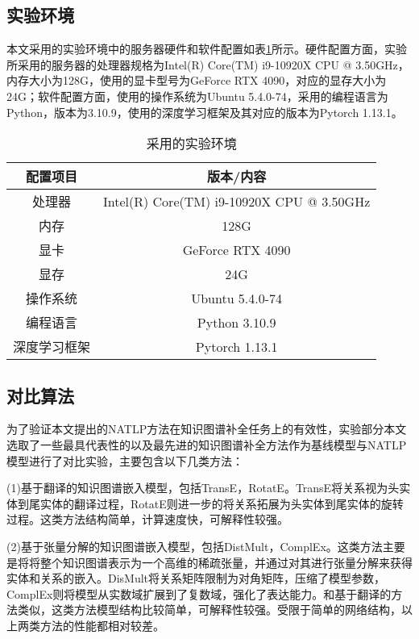 \subsection{实验环境}

本文采用的实验环境中的服务器硬件和软件配置如表\ref{environment}所示。硬件配置方面，实验所采用的服务器的处理器规格为Intel(R) Core(TM) i9-10920X CPU @ 3.50GHz，内存大小为128G，使用的显卡型号为GeForce RTX 4090，对应的显存大小为24G；软件配置方面，使用的操作系统为Ubuntu 5.4.0-74，采用的编程语言为Python，版本为3.10.9，使用的深度学习框架及其对应的版本为Pytorch 1.13.1。

\begin{table}[htbp]
    \renewcommand\arraystretch{1.5}
    \caption{采用的实验环境}
    \centering
    \begin{tabular}{*{2}{c}}
      \toprule
      配置项目 & 版本/内容\\
      \midrule
      处理器  & Intel(R) Core(TM) i9-10920X CPU @ 3.50GHz \\
      内存 & 128G\\
      显卡 & GeForce RTX 4090\\
      显存 & 24G\\
      操作系统 & Ubuntu 5.4.0-74\\
      编程语言 & Python 3.10.9\\
      深度学习框架 & Pytorch 1.13.1\\
      \bottomrule
    \end{tabular}
    \label{environment}
\end{table}


\subsection{对比算法}

为了验证本文提出的NATLP方法在知识图谱补全任务上的有效性，实验部分本文选取了一些最具代表性的以及最先进的知识图谱补全方法作为基线模型与NATLP模型进行了对比实验，主要包含以下几类方法：

(1)基于翻译的知识图谱嵌入模型，包括TransE，RotatE。TransE将关系视为头实体到尾实体的翻译过程，RotatE则进一步的将关系拓展为头实体到尾实体的旋转过程。这类方法结构简单，计算速度快，可解释性较强。

(2)基于张量分解的知识图谱嵌入模型，包括DistMult，ComplEx。这类方法主要是将将整个知识图谱表示为一个高维的稀疏张量，并通过对其进行张量分解来获得实体和关系的嵌入。DisMult将关系矩阵限制为对角矩阵，压缩了模型参数，ComplEx则将模型从实数域扩展到了复数域，强化了表达能力。和基于翻译的方法类似，这类方法模型结构比较简单，可解释性较强。受限于简单的网络结构，以上两类方法的性能都相对较差。
 
